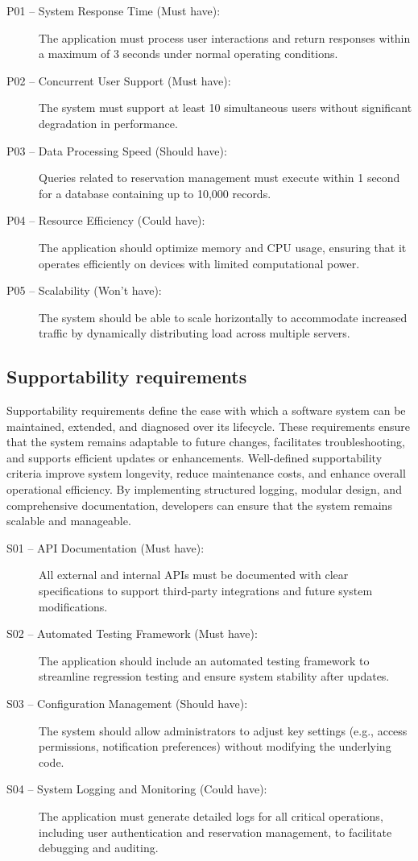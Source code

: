 \begin{description}
  \item	[P01 -- System Response Time (Must have):] The application must process user interactions and return responses within a maximum of 3 seconds under normal operating conditions.
	\item	[P02 -- Concurrent User Support (Must have):] The system must support at least 10 simultaneous users without significant degradation in performance.
	\item	[P03 -- Data Processing Speed (Should have):] Queries related to reservation management must execute within 1 second for a database containing up to 10,000 records.
  \item	[P04 -- Resource Efficiency (Could have):] The application should optimize memory and CPU usage, ensuring that it operates efficiently on devices with limited computational power.
	\item	[P05 -- Scalability (Won’t have):] The system should be able to scale horizontally to accommodate increased traffic by dynamically distributing load across multiple servers.
\end{description}

\subsection{Supportability requirements}

Supportability requirements define the ease with which a software system can be maintained, extended, and diagnosed over its lifecycle. These requirements ensure that the system remains adaptable to future changes, facilitates troubleshooting, and supports efficient updates or enhancements. Well-defined supportability criteria improve system longevity, reduce maintenance costs, and enhance overall operational efficiency. By implementing structured logging, modular design, and comprehensive documentation, developers can ensure that the system remains scalable and manageable.

\begin{description}
  \item	[S01 -- API Documentation (Must have):] All external and internal APIs must be documented with clear specifications to support third-party integrations and future system modifications.
	\item	[S02 -- Automated Testing Framework (Must have):] The application should include an automated testing framework to streamline regression testing and ensure system stability after updates.
	\item	[S03 -- Configuration Management (Should have):] The system should allow administrators to adjust key settings (e.g., access permissions, notification preferences) without modifying the underlying code.
  \item	[S04 -- System Logging and Monitoring (Could have):] The application must generate detailed logs for all critical operations, including user authentication and reservation management, to facilitate debugging and auditing.
\end{description}

